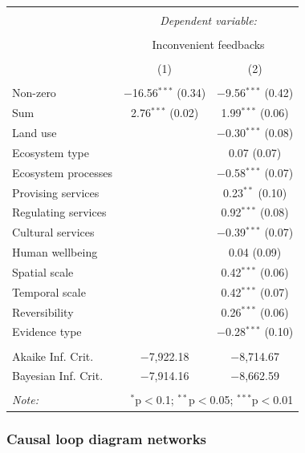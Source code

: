 \documentclass[9pt,]{article}
\begin{document}
\begin{tabular}{@{\extracolsep{5pt}}lcc} 
\\[-1.8ex]\hline 
\hline \\[-1.8ex] 
 & \multicolumn{2}{c}{\textit{Dependent variable:}} \\ 
\cline{2-3} 
\\[-1.8ex] & \multicolumn{2}{c}{Inconvenient feedbacks} \\ 
\\[-1.8ex] & (1) & (2)\\ 
\hline \\[-1.8ex] 
 Non-zero & $-$16.56$^{***}$ (0.34) & $-$9.56$^{***}$ (0.42) \\ 
  Sum & 2.76$^{***}$ (0.02) & 1.99$^{***}$ (0.06) \\ 
  Land use &  & $-$0.30$^{***}$ (0.08) \\ 
  Ecosystem type &  & 0.07 (0.07) \\ 
  Ecosystem processes &  & $-$0.58$^{***}$ (0.07) \\ 
  Provising services &  & 0.23$^{**}$ (0.10) \\ 
  Regulating services &  & 0.92$^{***}$ (0.08) \\ 
  Cultural services &  & $-$0.39$^{***}$ (0.07) \\ 
  Human wellbeing &  & 0.04 (0.09) \\ 
  Spatial scale &  & 0.42$^{***}$ (0.06) \\ 
  Temporal scale &  & 0.42$^{***}$ (0.07) \\ 
  Reversibility &  & 0.26$^{***}$ (0.06) \\ 
  Evidence type &  & $-$0.28$^{***}$ (0.10) \\ 
 \hline \\[-1.8ex] 
Akaike Inf. Crit. & $-$7,922.18 & $-$8,714.67 \\ 
Bayesian Inf. Crit. & $-$7,914.16 & $-$8,662.59 \\ 
\hline 
\hline \\[-1.8ex] 
\textit{Note:}  & \multicolumn{2}{r}{$^{*}$p$<$0.1; $^{**}$p$<$0.05; $^{***}$p$<$0.01} \\ 
\end{tabular}

\endgroup 

\subsubsection{Causal loop diagram
networks}\label{causal-loop-diagram-networks}
\end{document}
